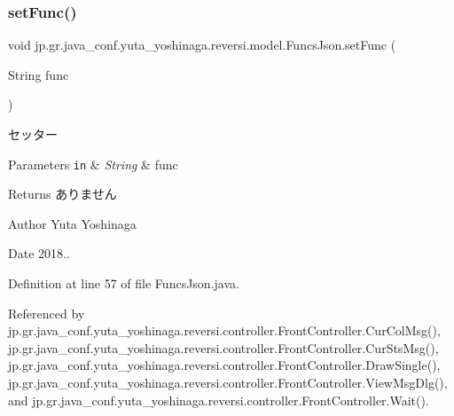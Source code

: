\subsubsection{\texorpdfstring{set\+Func()}{setFunc()}}
{\footnotesize\ttfamily void jp.\+gr.\+java\+\_\+conf.\+yuta\+\_\+yoshinaga.\+reversi.\+model.\+Funcs\+Json.\+set\+Func (\begin{DoxyParamCaption}\item[{String}]{func }\end{DoxyParamCaption})}



セッター 


\begin{DoxyParams}[1]{Parameters}
\mbox{\tt in}  & {\em String} & func \\
\hline
\end{DoxyParams}
\begin{DoxyReturn}{Returns}
ありません 
\end{DoxyReturn}
\begin{DoxyAuthor}{Author}
Yuta Yoshinaga 
\end{DoxyAuthor}
\begin{DoxyDate}{Date}
2018.. 
\end{DoxyDate}


Definition at line 57 of file Funcs\+Json.\+java.



Referenced by jp.\+gr.\+java\+\_\+conf.\+yuta\+\_\+yoshinaga.\+reversi.\+controller.\+Front\+Controller.\+Cur\+Col\+Msg(), jp.\+gr.\+java\+\_\+conf.\+yuta\+\_\+yoshinaga.\+reversi.\+controller.\+Front\+Controller.\+Cur\+Sts\+Msg(), jp.\+gr.\+java\+\_\+conf.\+yuta\+\_\+yoshinaga.\+reversi.\+controller.\+Front\+Controller.\+Draw\+Single(), jp.\+gr.\+java\+\_\+conf.\+yuta\+\_\+yoshinaga.\+reversi.\+controller.\+Front\+Controller.\+View\+Msg\+Dlg(), and jp.\+gr.\+java\+\_\+conf.\+yuta\+\_\+yoshinaga.\+reversi.\+controller.\+Front\+Controller.\+Wait().

